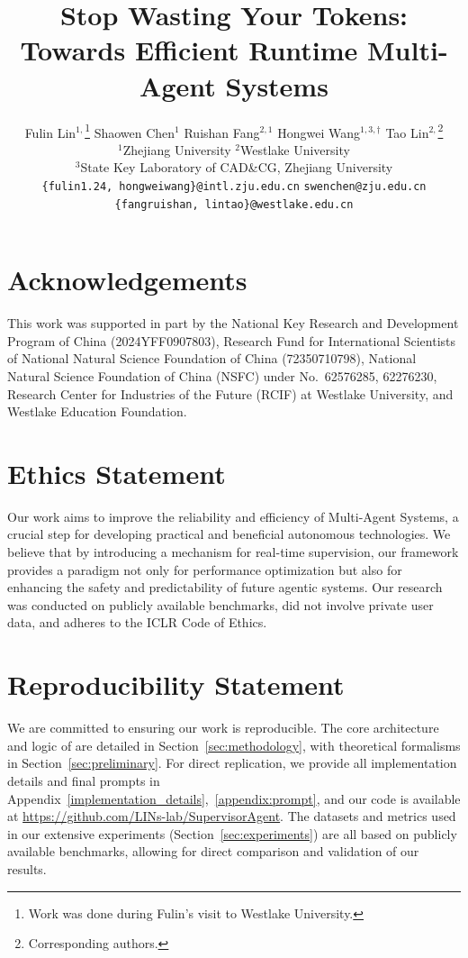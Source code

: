 \documentclass{article} %
\title{Stop Wasting Your Tokens: Towards Efficient Runtime Multi-Agent Systems}
\author{%
    Fulin Lin$^{1,}$\thanks{Work was done during Fulin's visit to Westlake University.} \quad Shaowen Chen$^{1}$ \quad Ruishan Fang$^{2,1}$ \quad Hongwei Wang$^{1,3,\dag}$  \quad Tao Lin$^{2,}$\thanks{Corresponding authors.}\\
  $^1$Zhejiang University \quad
  $^2$Westlake University \\
  $^3$State Key Laboratory of CAD\&CG, Zhejiang University \\
  \texttt{\{fulin1.24, hongweiwang\}@intl.zju.edu.cn} \quad \texttt{swenchen@zju.edu.cn} \\ \texttt{\{fangruishan, lintao\}@westlake.edu.cn}
}
\begin{document}
\maketitle



\newpage
\section*{Acknowledgements}
This work was supported in part by the National Key Research and Development Program of China (2024YFF0907803), Research Fund for International Scientists of National Natural Science Foundation of China (72350710798), National Natural Science Foundation of China (NSFC) under No.\ 62576285, 62276230, Research Center for Industries of the Future (RCIF) at Westlake University, and Westlake Education Foundation.

\section*{Ethics Statement}
Our work aims to improve the reliability and efficiency of Multi-Agent Systems, a crucial step for developing practical and beneficial autonomous technologies. We believe that by introducing a mechanism for real-time supervision, our framework provides a paradigm not only for performance optimization but also for enhancing the safety and predictability of future agentic systems. Our research was conducted on publicly available benchmarks, did not involve private user data, and adheres to the ICLR Code of Ethics.


\section*{Reproducibility Statement}
We are committed to ensuring our work is reproducible. The core architecture and logic of \method{} are detailed in Section~\ref{sec:methodology}, with theoretical formalisms in Section~\ref{sec:preliminary}. For direct replication, we provide all implementation details and final prompts in Appendix~\ref{implementation_details},~\ref{appendix:prompt}, and our code is available at \url{https://github.com/LINs-lab/SupervisorAgent}. The datasets and metrics used in our extensive experiments (Section~\ref{sec:experiments}) are all based on publicly available benchmarks, allowing for direct comparison and validation of our results.





\clearpage
\appendix

\end{document}
